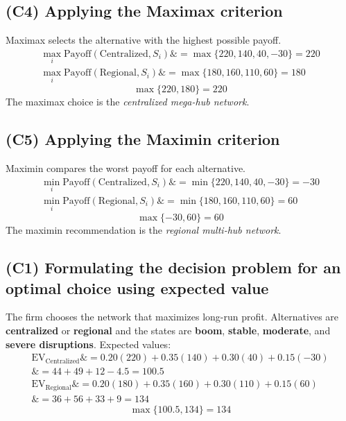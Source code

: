 \documentclass[11pt]{article}
\begin{document}
	\subsection*{(C4) Applying the Maximax criterion}
	
	\hypertarget{problem3-c4}{}
	
	Maximax selects the alternative with the highest possible payoff.
	\[
	\begin{aligned}
		\max_i \text{Payoff}(\text{Centralized}, S_i) \&= \max\{220, 140, 40, -30\} = 220 \\
		\max_i \text{Payoff}(\text{Regional}, S_i) \&= \max\{180, 160, 110, 60\} = 180
	\end{aligned}
	\]
	\[
	\max\{220, 180\} = 220
	\]
	The maximax choice is the \emph{centralized mega-hub network}.
	
	\subsection*{(C5) Applying the Maximin criterion}
	
	\hypertarget{problem3-c5}{}
	
	Maximin compares the worst payoff for each alternative.
	\[
	\begin{aligned}
		\min_i \text{Payoff}(\text{Centralized}, S_i) \&= \min\{220, 140, 40, -30\} = -30 \\
		\min_i \text{Payoff}(\text{Regional}, S_i) \&= \min\{180, 160, 110, 60\} = 60
	\end{aligned}
	\]
	\[
	\max\{-30, 60\} = 60
	\]
	The maximin recommendation is the \emph{regional multi-hub network}.
	
	\subsection*{(C1) Formulating the decision problem for an optimal choice using expected value}
	
	\hypertarget{problem3-c1}{}
	
	The firm chooses the network that maximizes long-run profit. Alternatives are \textbf{centralized} or
	\textbf{regional} and the states are \textbf{boom}, \textbf{stable}, \textbf{moderate},
	and \textbf{severe disruptions}. Expected values:
	\[
	\begin{aligned}
		\mathrm{EV}_{\text{Centralized}} \&= 0.20(220) + 0.35(140) + 0.30(40) + 0.15(-30) \\
		\&= 44 + 49 + 12 - 4.5 = 100.5 \\
		\mathrm{EV}_{\text{Regional}} \&= 0.20(180) + 0.35(160) + 0.30(110) + 0.15(60) \\
		\&= 36 + 56 + 33 + 9 = 134
	\end{aligned}
	\]
	\[
	\max\{100.5, 134\} = 134
	\]
	
\end{document}
